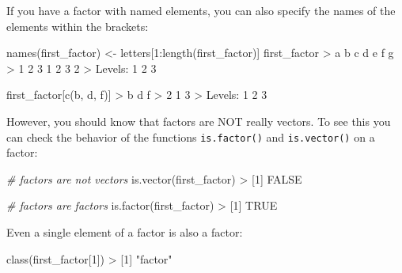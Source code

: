 \documentclass[
]{book}
\newenvironment{Shaded}{\begin{snugshade}}{\end{snugshade}}
\newcommand{\CommentTok}[1]{\textcolor[rgb]{0.56,0.35,0.01}{\textit{#1}}}
\newcommand{\ConstantTok}[1]{\textcolor[rgb]{0.00,0.00,0.00}{#1}}
\newcommand{\DecValTok}[1]{\textcolor[rgb]{0.00,0.00,0.81}{#1}}
\newcommand{\FunctionTok}[1]{\textcolor[rgb]{0.00,0.00,0.00}{#1}}
\newcommand{\NormalTok}[1]{#1}
\newcommand{\OtherTok}[1]{\textcolor[rgb]{0.56,0.35,0.01}{#1}}
\newcommand{\SpecialCharTok}[1]{\textcolor[rgb]{0.00,0.00,0.00}{#1}}
\newcommand{\StringTok}[1]{\textcolor[rgb]{0.31,0.60,0.02}{#1}}
\begin{document}
If you have a factor with named elements, you can also specify the names of
the elements within the brackets:

\begin{Shaded}
\begin{Highlighting}[]
\FunctionTok{names}\NormalTok{(first\_factor) }\OtherTok{\textless{}{-}}\NormalTok{ letters[}\DecValTok{1}\SpecialCharTok{:}\FunctionTok{length}\NormalTok{(first\_factor)]}
\NormalTok{first\_factor}
\SpecialCharTok{\textgreater{}}\NormalTok{ a b c d e f g }
\SpecialCharTok{\textgreater{}} \DecValTok{1} \DecValTok{2} \DecValTok{3} \DecValTok{1} \DecValTok{2} \DecValTok{3} \DecValTok{2} 
\SpecialCharTok{\textgreater{}}\NormalTok{ Levels}\SpecialCharTok{:} \DecValTok{1} \DecValTok{2} \DecValTok{3}

\NormalTok{first\_factor[}\FunctionTok{c}\NormalTok{(}\StringTok{\textquotesingle{}b\textquotesingle{}}\NormalTok{, }\StringTok{\textquotesingle{}d\textquotesingle{}}\NormalTok{, }\StringTok{\textquotesingle{}f\textquotesingle{}}\NormalTok{)]}
\SpecialCharTok{\textgreater{}}\NormalTok{ b d f }
\SpecialCharTok{\textgreater{}} \DecValTok{2} \DecValTok{1} \DecValTok{3} 
\SpecialCharTok{\textgreater{}}\NormalTok{ Levels}\SpecialCharTok{:} \DecValTok{1} \DecValTok{2} \DecValTok{3}
\end{Highlighting}
\end{Shaded}

However, you should know that factors are NOT really vectors. To see this you
can check the behavior of the functions \texttt{is.factor()} and \texttt{is.vector()} on a
factor:

\begin{Shaded}
\begin{Highlighting}[]
\CommentTok{\# factors are not vectors}
\FunctionTok{is.vector}\NormalTok{(first\_factor)}
\SpecialCharTok{\textgreater{}}\NormalTok{ [}\DecValTok{1}\NormalTok{] }\ConstantTok{FALSE}

\CommentTok{\# factors are factors}
\FunctionTok{is.factor}\NormalTok{(first\_factor)}
\SpecialCharTok{\textgreater{}}\NormalTok{ [}\DecValTok{1}\NormalTok{] }\ConstantTok{TRUE}
\end{Highlighting}
\end{Shaded}

Even a single element of a factor is also a factor:

\begin{Shaded}
\begin{Highlighting}[]
\FunctionTok{class}\NormalTok{(first\_factor[}\DecValTok{1}\NormalTok{])}
\SpecialCharTok{\textgreater{}}\NormalTok{ [}\DecValTok{1}\NormalTok{] }\StringTok{"factor"}
\end{Highlighting}
\end{Shaded}
\end{document}
